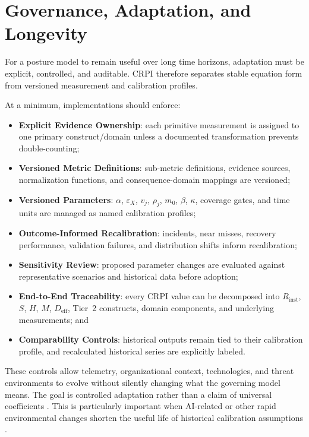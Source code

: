 \documentclass[11pt]{article}
\begin{document}
\section{Governance, Adaptation, and Longevity}
\label{sec:governance}
For a posture model to remain useful over long time horizons, adaptation must be
explicit, controlled, and auditable. CRPI therefore separates stable equation form from
versioned measurement and calibration profiles.

At a minimum, implementations should enforce:
\begin{itemize}
  \item \textbf{Explicit Evidence Ownership}: each primitive measurement is assigned to
    one primary construct/domain unless a documented transformation prevents
    double-counting;
  \item \textbf{Versioned Metric Definitions}: sub-metric definitions, evidence sources,
    normalization functions, and consequence-domain mappings are versioned;
  \item \textbf{Versioned Parameters}: $\alpha$, $\varepsilon_X$, $v_j$, $\rho_j$,
    $m_0$, $\beta$, $\kappa$, coverage gates, and time units are managed as named
    calibration profiles;
  \item \textbf{Outcome-Informed Recalibration}: incidents, near misses, recovery
    performance, validation failures, and distribution shifts inform recalibration;
  \item \textbf{Sensitivity Review}: proposed parameter changes are evaluated against
    representative scenarios and historical data before adoption;
  \item \textbf{End-to-End Traceability}: every CRPI value can be decomposed into
    $R_{\mathrm{inst}}$, $S$, $H$, $M$, $D_{\mathrm{eff}}$, Tier~2 constructs, domain
    components, and underlying measurements; and
  \item \textbf{Comparability Controls}: historical outputs remain tied to their
    calibration profile, and recalculated historical series are explicitly labeled.
\end{itemize}

These controls allow telemetry, organizational context, technologies, and threat
environments to evolve without silently changing what the governing model means. The
goal is controlled adaptation rather than a claim of universal coefficients
\cite{nist80039,nistir8286r1,iso31000}. This is particularly important when AI-related
or other rapid environmental changes shorten the useful life of historical calibration
assumptions \cite{nist-ai-rmf,verizon-dbir}.
\end{document}
